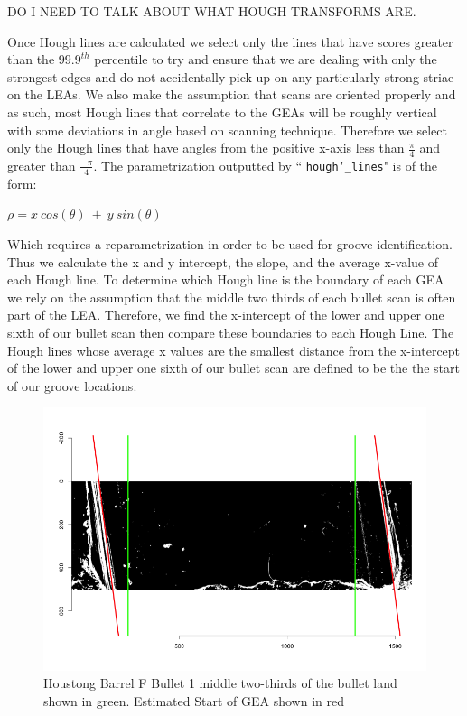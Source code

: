 \documentclass[12pt]{article}
\theoremstyle{nonumberplain}
\begin{document}
DO I NEED TO TALK ABOUT WHAT HOUGH TRANSFORMS ARE. 

Once Hough lines are calculated we select only the lines that have scores greater than the $99.9^{th}$ percentile to try and ensure that we are dealing with only the strongest edges and do not accidentally pick up on any particularly strong striae on the LEAs. We also make the assumption that scans are oriented properly and as such, most Hough lines that correlate to the GEAs will be roughly vertical with some deviations in angle based on scanning technique. Therefore we select only the Hough lines that have angles from the positive x-axis less than $\frac{\pi}{4}$ and greater than $\frac{-\pi}{4}$. The parametrization outputted by `` \texttt{hough\char`_lines}" is of the form:

\begin{center}
$\rho = x \ cos(\theta) \ + \ y \ sin(\theta)$
\end{center}

Which requires a reparametrization in order to be used for groove identification. Thus we calculate the x and y intercept, the slope, and the average x-value of each Hough line. To determine which Hough line is the boundary of each GEA we rely on the assumption that the middle two thirds of each bullet scan is often part of the LEA. Therefore, we find the x-intercept of the lower and upper one sixth of our bullet scan then compare these boundaries to each Hough Line. The Hough lines whose average x values are the smallest distance from the x-intercept of the lower and upper one sixth of our bullet scan are defined to be the the start of our groove locations. 

\begin{figure}[!ht]
  \centering
  \includegraphics[width = .9\textwidth]{../images/Hamby_252_Bullet1_Land3_BestFit}
  \caption{Houstong Barrel F Bullet 1 middle two-thirds of the bullet land shown in green. Estimated Start of GEA shown in red}
  \label{fig: midtwothird}
\end{figure}
\end{document}
